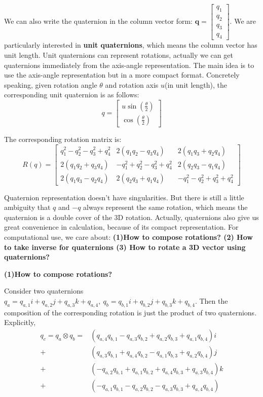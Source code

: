 \documentclass[
]{book}
\theoremstyle{definition}
\theoremstyle{definition}
\theoremstyle{definition}
\theoremstyle{definition}
\theoremstyle{remark}
\begin{document}
We can also write the quaternion in the column vector form: \(\textbf{q} = \begin{bmatrix} q_1\\q_2\\q_3\\q_4 \end{bmatrix}\). We are particularly interested in \textbf{unit quaternions}, which means the column vector has unit length. Unit quaternions can represent rotations, actually we can get quaternions immediately from the axis-angle representation. The main idea is to use the axis-angle representation but in a more compact format. Concretely speaking, given rotation angle \(\theta\) and rotation axis \(u\)(in unit length), the corresponding unit quaternion is as follows: \[q = \begin{bmatrix}u\sin(\frac{\theta}{2}) \\ \cos(\frac{\theta}{2})\end{bmatrix}\]

The corresponding rotation matrix is:
\[R(q) = \begin{bmatrix} q_1^2 - q_2^2 - q_3^2 + q_4^2  &2(q_1q_2-q_3q_4) &2(q_1q_3 +q_2q_4)\\
2(q_1q_2+q_3q_4) & -q_1^2+q_2^2-q_3^2+q_4^2 &2(q_2q_3 - q_1q_4)\\
2(q_1q_3-q_2q_4) &2(q_2q_3+q_1q_4) &-q_1^2-q_2^2+q_3^2+q_4^2 \end{bmatrix}\]

Quaternion representation doesn't have singularities. But there is still a little ambiguity that \(q\) and \(-q\) always represent the same rotation, which means the quaternion is a double cover of the 3D rotation. Actually, quaternions also give us great convenience in calculation, because of its compact representation. For computational use, we care about: \textbf{(1)How to compose rotations? (2) How to take inverse for quaternions (3) How to rotate a 3D vector using quaternions?}

\textbf{(1)How to compose rotations? }

Consider two quaternions \(q_a = q_{a,1}i +q_{a,2}j +q_{a,3}k +q_{a,4},\  q_b = q_{b,1}i +q_{b,2}j +q_{b,3}k +q_{b,4}\). Then the composition of the corresponding rotation is just the product of two quaternions. Explicitly,
\begin{align}
q_c = q_a\otimes q_b =& (q_{a,4}q_{b,1} -q_{a,3}q_{b,2} + q_{a,2}q_{b,3} + q_{a,1}q_{b,4})i \\
+& (q_{a,3}q_{b,1} +q_{a,4}q_{b,2} - q_{a,1}q_{b,3} + q_{a,2}q_{b,4})j \\
+& (-q_{a,2}q_{b,1} +q_{a,1}q_{b,2} + q_{a,4}q_{b,3} + q_{a,3}q_{b,4})k \\
+& (-q_{a,1}q_{b,1} -q_{a,2}q_{b,2} - q_{a,3}q_{b,3} + q_{a,4}q_{b,4})
\end{align}
\end{document}
